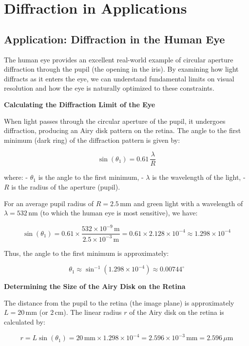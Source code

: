 \documentclass[
  a4paper,
]{book}
\begin{document}
\chapter{Diffraction in Applications}\label{diffraction-in-applications}

\section{Application: Diffraction in the Human
Eye}\label{application-diffraction-in-the-human-eye}

The human eye provides an excellent real-world example of circular
aperture diffraction through the pupil (the opening in the iris). By
examining how light diffracts as it enters the eye, we can understand
fundamental limits on visual resolution and how the eye is naturally
optimized to these constraints.

\textbf{Calculating the Diffraction Limit of the Eye}

When light passes through the circular aperture of the pupil, it
undergoes diffraction, producing an Airy disk pattern on the retina. The
angle to the first minimum (dark ring) of the diffraction pattern is
given by:

\[
\sin(\theta_1) = 0.61\, \frac{\lambda}{R}
\]

where: - \(\theta_1\) is the angle to the first minimum, - \(\lambda\)
is the wavelength of the light, - \(R\) is the radius of the aperture
(pupil).

For an average pupil radius of \(R = 2.5\, \text{mm}\) and green light
with a wavelength of \(\lambda = 532\, \text{nm}\) (to which the human
eye is most sensitive), we have:

\[
\sin(\theta_1) = 0.61 \times \frac{532 \times 10^{-9}\, \text{m}}{2.5 \times 10^{-3}\, \text{m}} = 0.61 \times 2.128 \times 10^{-4} \approx 1.298 \times 10^{-4}
\]

Thus, the angle to the first minimum is approximately:

\[
\theta_1 \approx \sin^{-1}(1.298 \times 10^{-4}) \approx 0.00744^\circ
\]

\textbf{Determining the Size of the Airy Disk on the Retina}

The distance from the pupil to the retina (the image plane) is
approximately \(L = 20\, \text{mm}\) (or \(2\, \text{cm}\)). The linear
radius \(r\) of the Airy disk on the retina is calculated by:

\[
r = L \sin(\theta_1) = 20\, \text{mm} \times 1.298 \times 10^{-4} = 2.596 \times 10^{-3}\, \text{mm} = 2.596\, \mu\text{m}
\]
\end{document}
